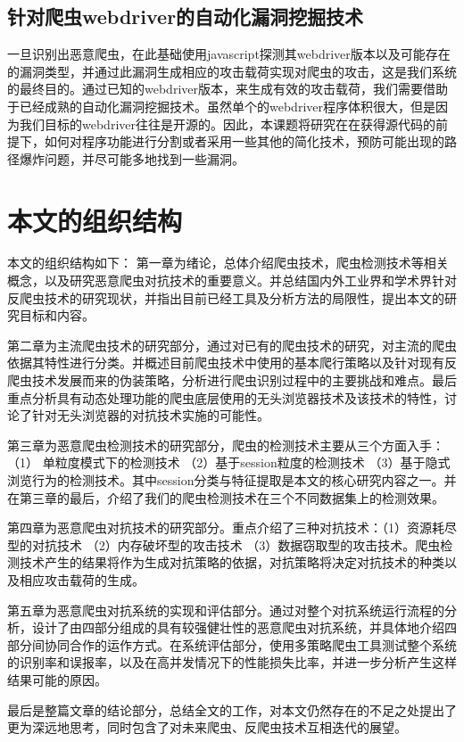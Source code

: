\documentclass[doctor,privacy,twoside]{buaa_mac}
\begin{document}
\subsection{针对爬虫webdriver的自动化漏洞挖掘技术}
一旦识别出恶意爬虫，在此基础使用javascript探测其webdriver版本以及可能存在的漏洞类型，并通过此漏洞生成相应的攻击载荷实现对爬虫的攻击，这是我们系统的最终目的。通过已知的webdriver版本，来生成有效的攻击载荷，我们需要借助于已经成熟的自动化漏洞挖掘技术。虽然单个的webdriver程序体积很大，但是因为我们目标的webdriver往往是开源的。因此，本课题将研究在在获得源代码的前提下，如何对程序功能进行分割或者采用一些其他的简化技术，预防可能出现的路径爆炸问题，并尽可能多地找到一些漏洞。


\section{本文的组织结构}
本文的组织结构如下：
第一章为绪论，总体介绍爬虫技术，爬虫检测技术等相关概念，以及研究恶意爬虫对抗技术的重要意义。并总结国内外工业界和学术界针对反爬虫技术的研究现状，并指出目前已经工具及分析方法的局限性，提出本文的研究目标和内容。


第二章为主流爬虫技术的研究部分，通过对已有的爬虫技术的研究，对主流的爬虫依据其特性进行分类。并概述目前爬虫技术中使用的基本爬行策略以及针对现有反爬虫技术发展而来的伪装策略，分析进行爬虫识别过程中的主要挑战和难点。最后重点分析具有动态处理功能的爬虫底层使用的无头浏览器技术及该技术的特性，讨论了针对无头浏览器的对抗技术实施的可能性。

第三章为恶意爬虫检测技术的研究部分，爬虫的检测技术主要从三个方面入手：（1） 单粒度模式下的检测技术 （2）基于session粒度的检测技术  （3）基于隐式浏览行为的检测技术。其中session分类与特征提取是本文的核心研究内容之一。并在第三章的最后，介绍了我们的爬虫检测技术在三个不同数据集上的检测效果。

第四章为恶意爬虫对抗技术的研究部分。重点介绍了三种对抗技术：（1）资源耗尽型的对抗技术 （2）内存破坏型的攻击技术 （3）数据窃取型的攻击技术。爬虫检测技术产生的结果将作为生成对抗策略的依据，对抗策略将决定对抗技术的种类以及相应攻击载荷的生成。

第五章为恶意爬虫对抗系统的实现和评估部分。通过对整个对抗系统运行流程的分析，设计了由四部分组成的具有较强健壮性的恶意爬虫对抗系统，并具体地介绍四部分间协同合作的运作方式。在系统评估部分，使用多策略爬虫工具测试整个系统的识别率和误报率，以及在高并发情况下的性能损失比率，并进一步分析产生这样结果可能的原因。

最后是整篇文章的结论部分，总结全文的工作，对本文仍然存在的不足之处提出了更为深远地思考，同时包含了对未来爬虫、反爬虫技术互相迭代的展望。
\end{document}
